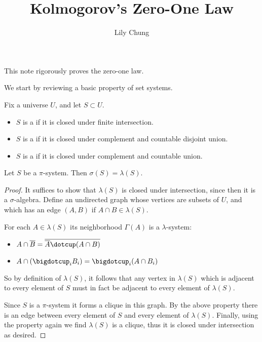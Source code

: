 \documentclass[11pt,a4paper]{article}
\title{Kolmogorov's Zero-One Law}
\author{
  Lily Chung
}
\date{}
\begin{document}
\maketitle

This note rigorously proves the zero-one law.

We start by reviewing a basic property of set systems.

\begin{definition}
  Fix a universe $U$, and let $S \subset U$.
  \begin{itemize}
  \item $S$ is a  if it is closed under finite intersection.
  \item $S$ is a  if it is closed under complement and countable disjoint union.
  \item $S$ is a  if it is closed under complement and countable union.
  \end{itemize}
\end{definition}

\begin{theorem}
  \label{thm:dynkin}
  Let $S$ be a $\pi$-system.  Then $\sigma(S) = \lambda(S)$.
\end{theorem}
\begin{proof}
  It suffices to show that $\lambda(S)$ is closed under intersection,
  since then it is a $\sigma$-algebra.
  Define an undirected graph whose vertices are subsets of $U$,
  and which has an edge $(A, B)$ if $A \cap B \in \lambda(S)$.

  For each $A \in \lambda(S)$ its neighborhood $\Gamma(A)$ is a $\lambda$-system:
  \begin{itemize}
  \item $A \cap \overline{B} = \overline{\overline{A} \dotcup (A \cap B)}$
  \item $A \cap \left(\bigdotcup_i B_i\right) = \bigdotcup_i (A \cap B_i)$
  \end{itemize}
  So by definition of $\lambda(S)$, it follows that any vertex in $\lambda(S)$ which is adjacent to every element of $S$ must in fact be adjacent to every element of $\lambda(S)$.

  Since $S$ is a $\pi$-system it forms a clique in this graph.
  By the above property there is an edge between every element of $S$ and every element of $\lambda(S)$.
  Finally, using the property again we find $\lambda(S)$ is a clique,
  thus it is closed under intersection as desired.
\end{proof}
\end{document}
